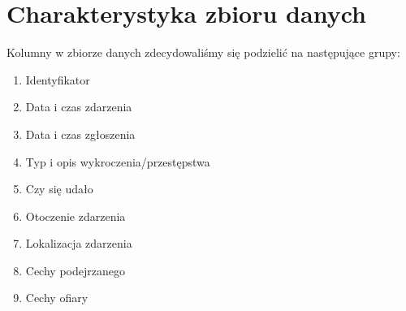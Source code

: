 \documentclass{classrep}
\begin{document}
    \section{Charakterystyka zbioru danych} \label{dataset_description} {
        Kolumny w zbiorze danych zdecydowaliśmy się podzielić na następujące grupy:
        \begin{enumerate}
            \item Identyfikator
            \item Data i czas zdarzenia
            \item Data i czas zgłoszenia
            \item Typ i opis wykroczenia/przestępstwa
            \item Czy się udało
            \item Otoczenie zdarzenia
            \item Lokalizacja zdarzenia
            \item Cechy podejrzanego
            \item Cechy ofiary
        \end{enumerate}
    }
\end{document}
